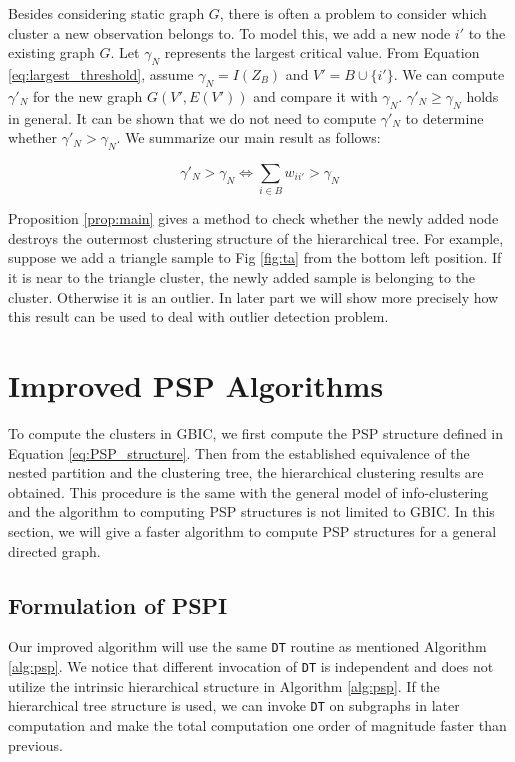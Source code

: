 Besides considering static graph $G$, there is often a problem to consider which cluster a new observation belongs to.
To model this, we add a new node $i'$ to the existing graph $G$. Let $\gamma_N$ represents the largest critical value.
From Equation \eqref{eq:largest_threshold}, assume $\gamma_N = I(Z_B)$ and $V'=B \cup \{i'\}$. We can compute $\gamma'_N$ for the new graph $G(V', E(V'))$ and compare it with $\gamma_N$. $\gamma'_N \geq \gamma_N$ holds in general. It can be shown that we do not need to compute $\gamma'_N$ to determine whether $\gamma'_N>\gamma_N$. We summarize our main result as follows:
\begin{proposition}\label{prop:main}
\begin{equation}
\gamma'_N > \gamma_N \iff  \sum_{i \in B} w_{ii'} > \gamma_N 
\end{equation}
\end{proposition}
Proposition \ref{prop:main} gives a method to check whether the newly added node destroys the outermost clustering structure of the hierarchical tree.  For example, suppose we add a triangle sample to Fig \ref{fig:ta} from the bottom left position. If it is near to the triangle cluster, the newly added sample is belonging to the cluster. Otherwise it is an outlier. In later part we will show more precisely how this result can be used to deal with outlier detection problem.

\section{Improved PSP Algorithms}\label{sec:alg}
To compute the clusters in GBIC, we first compute the PSP structure defined in Equation \eqref{eq:PSP_structure}. Then from the established equivalence of the nested partition and the clustering tree, the hierarchical
clustering results are obtained. This procedure is the same with the general model of info-clustering and the algorithm to computing PSP structures is not limited to GBIC. In this section, we will give a faster algorithm to compute PSP structures for a general directed graph.

\subsection{Formulation of PSPI}
Our improved algorithm will use the same \texttt{DT} routine as mentioned Algorithm \ref{alg:psp}. We notice that different invocation of \texttt{DT} is independent and does not utilize the intrinsic hierarchical structure in Algorithm \ref{alg:psp}. If the hierarchical tree structure is used, we can invoke \texttt{DT} on subgraphs in later computation and make the total computation one order of magnitude faster than previous.

